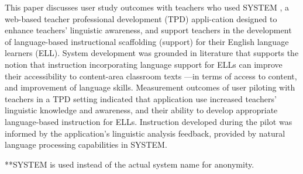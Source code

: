 This paper discusses user study outcomes with teachers who used SYSTEM , a web-based teacher professional development (TPD) appli-cation designed to
 enhance teachers' linguistic awareness, and support teachers in the
 development of language-based instructional scaffolding (support) for their
 English language learners (ELL). System development was grounded in literature
 that supports the notion that instruction incorporating language support for
 ELLs can improve their accessibility to content-area classroom texts ---in
 terms of access to content, and improvement of language skills. Measurement
 outcomes of user piloting with teachers in a TPD setting indicated that
 application use increased teachers' linguistic knowledge and awareness, and
 their ability to develop appropriate language-based instruction for ELLs.
 Instruction developed during the pilot was informed by the application's
 linguistic analysis feedback, provided by natural language processing
 capabilities in SYSTEM.
 
 **SYSTEM is used instead of the actual system name for anonymity.

